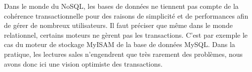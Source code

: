 	Dans le monde du NoSQL, les bases de données ne tiennent pas compte de la cohérence transactionnelle pour des raisons de simplicité et de performances afin de gérer de nombreux utilisateurs. Il faut préciser que même dans le monde relationnel, certains moteurs ne gèrent pas les transactions. C'est par exemple le cas du moteur de stockage MyISAM de la base de données MySQL. Dans la pratique, les lectures sales n'engendrent que très rarement des problèmes, nous avons donc ici une vision optimiste des transactions.
